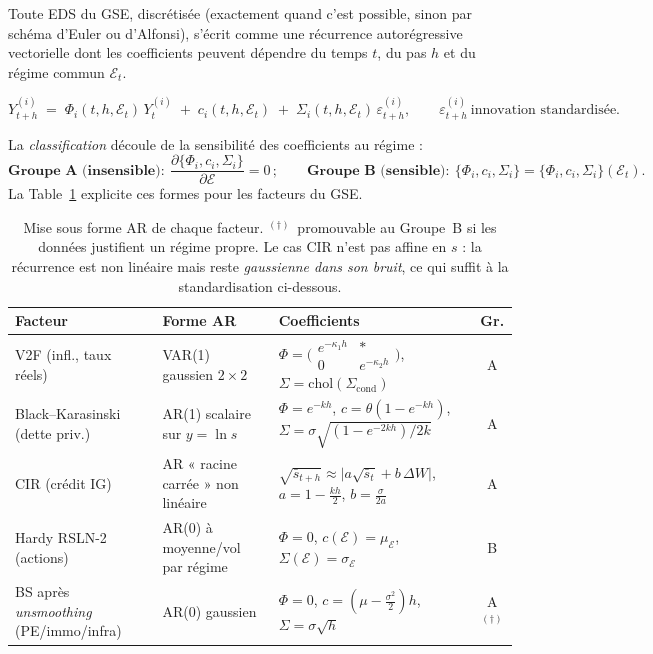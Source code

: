 \documentclass[11pt,a4paper]{article}
\theoremstyle{definition}
\newcommand{\Ecal}{\mathcal{E}}
\newcommand{\eps}{\varepsilon}
\begin{document}
Toute EDS du GSE, discrétisée (exactement quand c'est possible, sinon par schéma d'Euler ou d'Alfonsi), s'écrit comme une récurrence autorégressive vectorielle dont les coefficients peuvent dépendre du temps $t$, du pas $h$ et du régime commun $\Ecal_t$.

\begin{definitionbox}
\[
Y^{(i)}_{t+h}\;=\;\Phi_i(t,h,\Ecal_t)\,Y^{(i)}_t\;+\;c_i(t,h,\Ecal_t)\;+\;\Sigma_i(t,h,\Ecal_t)\,\eps^{(i)}_{t+h},
\qquad \eps^{(i)}_{t+h}\ \text{innovation standardisée.}
\]
\end{definitionbox}

\noindent La \emph{classification} découle de la sensibilité des coefficients au régime :
\[
\textbf{Groupe A (insensible)}:\ \frac{\partial\{\Phi_i,c_i,\Sigma_i\}}{\partial\Ecal}=0\,;
\qquad
\textbf{Groupe B (sensible)}:\ \{\Phi_i,c_i,\Sigma_i\}=\{\Phi_i,c_i,\Sigma_i\}(\Ecal_t).
\]
La Table~\ref{tab:formes} explicite ces formes pour les facteurs du GSE.

\begin{table}[h]
\centering\small
\renewcommand{\arraystretch}{1.35}
\begin{tabularx}{\textwidth}{@{}l l X c@{}}
\toprule
\textbf{Facteur} & \textbf{Forme AR} & \textbf{Coefficients} & \textbf{Gr.} \\
\midrule
V2F (infl., taux réels) & VAR(1) gaussien $2{\times}2$ &
$\Phi=\bigl(\begin{smallmatrix}e^{-\kappa_1 h}&\ast\\ 0&e^{-\kappa_2 h}\end{smallmatrix}\bigr)$, $\Sigma=\mathrm{chol}(\Sigma_{\mathrm{cond}})$ & A \\
Black--Karasinski (dette priv.) & AR(1) scalaire sur $y=\ln s$ &
$\Phi=e^{-kh}$, $c=\theta(1-e^{-kh})$, $\Sigma=\sigma\sqrt{(1-e^{-2kh})/2k}$ & A \\
CIR (crédit IG) & AR « racine carrée » non linéaire &
$\sqrt{\bar s_{t+h}}\approx\big|a\sqrt{\bar s_t}+b\,\Delta W\big|$, $a=1-\tfrac{kh}{2}$, $b=\tfrac{\sigma}{2a}$ & A \\
Hardy RSLN-2 (actions) & AR(0) à moyenne/vol par régime &
$\Phi=0$, $c(\Ecal)=\mu_\Ecal$, $\Sigma(\Ecal)=\sigma_\Ecal$ & B \\
BS après \emph{unsmoothing} (PE/immo/infra) & AR(0) gaussien &
$\Phi=0$, $c=(\mu-\tfrac{\sigma^2}{2})h$, $\Sigma=\sigma\sqrt h$ & A$^{(\dagger)}$ \\
\bottomrule
\end{tabularx}
\caption{Mise sous forme AR de chaque facteur. $^{(\dagger)}$~promouvable au Groupe~B si les données justifient un régime propre. Le cas CIR n'est pas affine en $s$ : la récurrence est non linéaire mais reste \emph{gaussienne dans son bruit}, ce qui suffit à la standardisation ci-dessous.}
\label{tab:formes}
\end{table}
\end{document}
